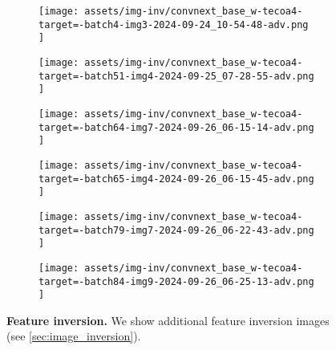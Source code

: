 \begin{figure*}[t]
    \vspace{1mm}
    \begin{minipage}[t]{.025\textwidth}
         \vspace{9mm}
    \end{minipage}%
    \begin{minipage}[t]{.98\textwidth}
        \vspace{0pt}
            \begin{subfigure}[t]{0.16\textwidth}
                    \texttt{[image:  assets/img-inv/convnext\_base\_w-tecoa4-target=-batch4-img3-2024-09-24\_10-54-48-adv.png ]}
            \end{subfigure}%
                \hspace{0.5mm}%
            \begin{subfigure}[t]{0.16\textwidth}
                    \texttt{[image:  assets/img-inv/convnext\_base\_w-tecoa4-target=-batch51-img4-2024-09-25\_07-28-55-adv.png ]}
            \end{subfigure}%
                \hspace{0.5mm}%
            \begin{subfigure}[t]{0.16\textwidth}
                    \texttt{[image:  assets/img-inv/convnext\_base\_w-tecoa4-target=-batch64-img7-2024-09-26\_06-15-14-adv.png ]}
            \end{subfigure}%
                \hspace{0.5mm}%
            \begin{subfigure}[t]{0.16\textwidth}
                    \texttt{[image:  assets/img-inv/convnext\_base\_w-tecoa4-target=-batch65-img4-2024-09-26\_06-15-45-adv.png ]}
            \end{subfigure}%
                \hspace{0.5mm}%
            \begin{subfigure}[t]{0.16\textwidth}
                    \texttt{[image:  assets/img-inv/convnext\_base\_w-tecoa4-target=-batch79-img7-2024-09-26\_06-22-43-adv.png ]}
            \end{subfigure}%
                \hspace{0.5mm}%
            \begin{subfigure}[t]{0.16\textwidth}
                    \texttt{[image:  assets/img-inv/convnext\_base\_w-tecoa4-target=-batch84-img9-2024-09-26\_06-25-13-adv.png ]}
            \end{subfigure}%
    \end{minipage}

    \vspace{1ex}
\caption{\textbf{Feature inversion.} We show additional feature inversion images (see \cref{sec:image_inversion}).}
\label{fig:features-inv-2}
\end{figure*}